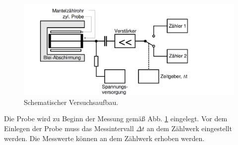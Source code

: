 \begin{figure}
  \centering
  \includegraphics[width=\textwidth]{V702_Aufbau.png}
  \caption{Schematischer Versuchsaufbau\cite{anleitung01}.}
  \label{fig:Aufbau}
\end{figure}

Die Probe wird zu Beginn der Messung gemäß Abb. \ref{fig:Aufbau} eingelegt.
Vor dem Einlegen der Probe muss das Messintervall $\Delta t$ an dem Zählwerk
eingestellt werden. Die Messwerte können an dem Zählwerk erhoben werden.

\newpage



\printbibliography


